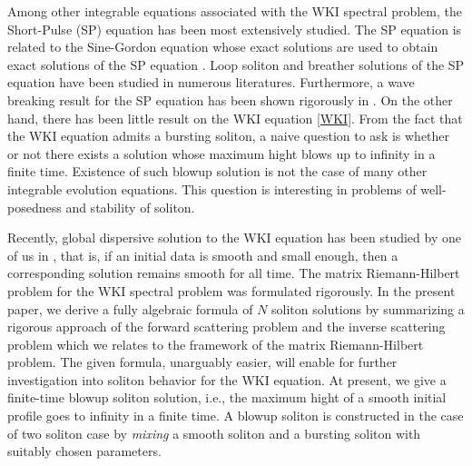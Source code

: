 \documentclass[11pt]{article}
\begin{document}
  
    
 
 
  
 Among other integrable equations associated with the WKI spectral problem, the Short-Pulse (SP) equation has been most extensively studied. %
The SP equation is related to the Sine-Gordon equation whose exact solutions are used to obtain exact solutions of the SP equation \cite{Sakovich-2006, Matsuno-2007}. Loop soliton and breather solutions of the SP equation have been studied in numerous literatures. 
Furthermore, a wave breaking result for the SP equation has been shown rigorously in \cite{Liu-Pelinovsky-Sakovich-2009}.    
On the other hand, there has been little result on the WKI equation \eqref{WKI}. From the fact that the WKI equation admits a bursting soliton, a naive question to ask is whether or not there exists a solution whose maximum hight blows up to infinity in a finite time.
Existence of such blowup solution is not the case of many other integrable evolution equations. This question is interesting in problems of well-posedness and stability of soliton. 

 Recently, global dispersive solution to the WKI equation has been studied by one of us in \cite{Shimabukuro-present}, that is, if an initial data is smooth and small enough, then a corresponding solution remains smooth for all time. The matrix Riemann-Hilbert problem for the WKI spectral problem was formulated rigorously. In the present paper, we derive a fully algebraic formula of $N$ soliton solutions by summarizing a rigorous approach \cite{Shimabukuro-present} of the forward scattering problem and the inverse scattering problem which we relates to the framework of the matrix Riemann-Hilbert problem. The given formula, unarguably easier, will enable for further investigation into soliton behavior for the WKI equation. At present, we give a finite-time blowup soliton solution, i.e., the maximum hight of a smooth initial profile goes to infinity in a finite time. A blowup soliton is constructed in the case of two soliton case by \emph{mixing} a smooth soliton and a bursting soliton with suitably chosen parameters. 
\end{document}
